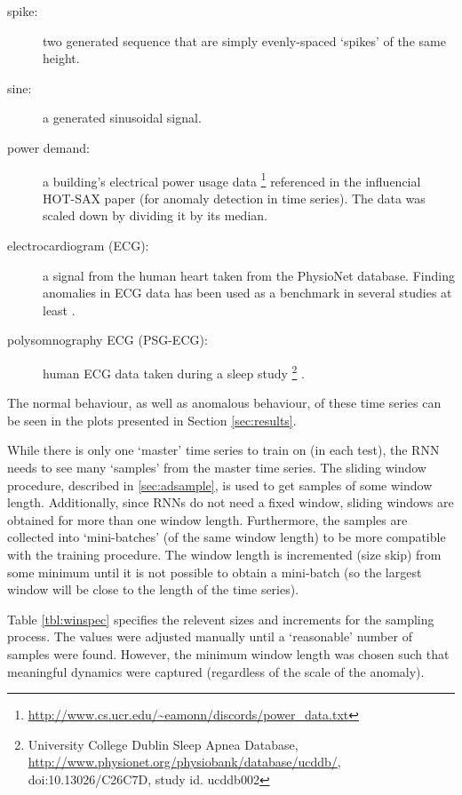 \begin{description}

\item[spike:] two generated sequence that are simply evenly-spaced `spikes' of the same height.

\item[sine:] a generated sinusoidal signal.

\item[power demand:] a building's electrical power usage data
\footnote{\url{http://www.cs.ucr.edu/~eamonn/discords/power_data.txt}} referenced in the influencial HOT-SAX paper \cite{Keogh2005} (for anomaly detection in time series). The data was scaled down by dividing it by its median.

\item[electrocardiogram  (ECG):] a signal from the human heart taken from the PhysioNet \cite{PhysioNet} database. Finding anomalies in ECG data has been used as a benchmark in several studies at least \cite{Malhotra2015,Keogh2005,Cheboli2010,li2012dimensionality,Wei2005,Chuah2007,Jones2014}.

\item[polysomnography ECG (PSG-ECG):] human ECG data \cite{PhysioNet} taken during a sleep study%
\footnote{University College Dublin Sleep Apnea Database, \url{http://www.physionet.org/physiobank/database/ucddb/}, doi:10.13026/C26C7D, study id. ucddb002}%
.


\end{description}
\noindent
%
The normal behaviour, as well as anomalous behaviour, of these time series can be seen in the plots presented in Section \ref{sec:results}.%

While there is only one `master' time series to train on (in each test), the RNN needs to see many `samples' from the master time series.
%
The sliding window procedure, described in \ref{sec:adsample}, is used to get samples of some window length.
%
Additionally, since RNNs do not need a fixed window, sliding windows are obtained for more than one window length.
%
Furthermore, the samples are collected into `mini-batches' (of the same window length) to be more compatible with the training procedure.
%
The window length is incremented (size skip) from some minimum until it is not possible to obtain a mini-batch (so the largest window will be close to the length of the time series).


Table \ref{tbl:winspec} specifies the relevent sizes and increments for the sampling process.
%
The values were adjusted manually until a `reasonable' number of samples were found.
%
However, the minimum window length was chosen such that meaningful dynamics were captured (regardless of the scale of the anomaly).

